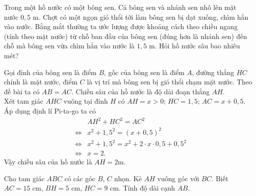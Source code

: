 \begin{vd}%
Trong một hồ nước có một bông sen. Cả bông sen và nhánh sen nhô lên mặt nước $ 0{,}5 $ m. Chợt có một ngọn gió thổi tới làm bông sen bị dạt xuống, chìm hẳn vào nước. Bằng mắt thường ta ước lượng được khoảng cách theo chiều ngang (tính theo mặt nước) từ chỗ ban đầu của bông sen (đúng hơn là nhánh sen) đến chỗ mà bông sen vừa chìm hẳn vào nước là $ 1{,}5 $ m. Hỏi hồ nước sâu bao nhiêu mét?
	\loigiai
	{
\immini
{

Gọi đỉnh của bông sen là điểm $ B $, gốc của bông sen là điểm $ A $, đường thẳng $ HC$ chính là mặt nước, điểm $ C $ là vị trí mà bông sen bị gió thổi chạm mặt nước. Theo đề bài ta có $ AB=AC$. Chiều sâu của hồ nước là độ dài đoạn thẳng $ AH $.\\
Xét tam giác $ AHC $ vuông tại đỉnh $ H $ có $ AH=x>0$; $ HC=1{,5}$; $ AC=x+0{,5} $. 
Áp dụng định lí Pi-ta-go ta có 
\begin{eqnarray*}
	&&AH^2+HC^2=AC^2\\
	&\Leftrightarrow& x^2+1{,}5^2=(x+0{,}5)^2\\
	&\Leftrightarrow& x^2+1{,}5^2=x^2+2\cdot x \cdot 0{,5}+0{,}5^2\\ 
	&\Leftrightarrow& x= 2.
\end{eqnarray*}
Vậy chiều sâu của hồ nước là $ AH=2 $m.	
}
{
}
	
	}
\end{vd}

\btvn


\begin{vn}
Cho tam giác $ABC$ có các góc $B$, $C$ nhọn. Kẻ $AH$ vuông góc với $BC$. Biết $AC=15$ cm, $BH=5$ cm, $HC=9$ cm. Tính độ dài cạnh $AB$.
\end{vn}



